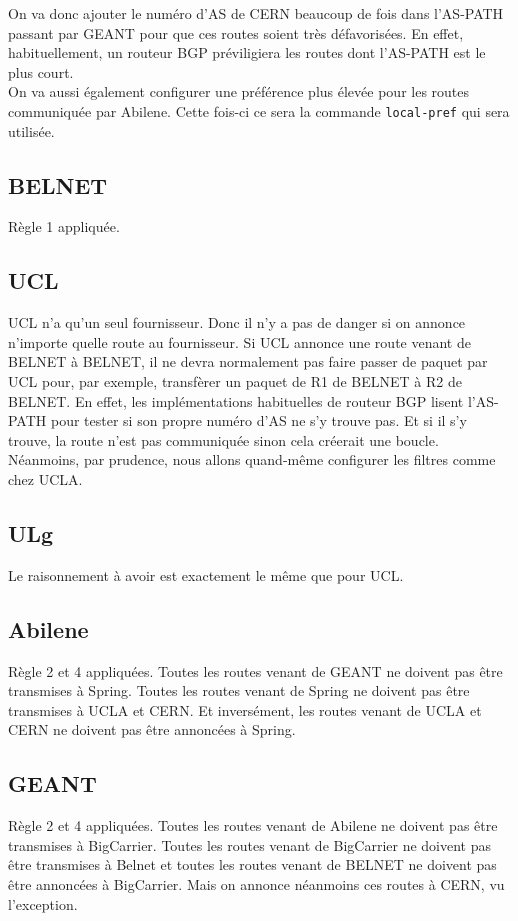 \documentclass[a4paper, 12pt]{article}
\begin{document}
On va donc ajouter le numéro d'AS de CERN beaucoup de fois dans l'AS-PATH passant par GEANT pour que ces routes soient très défavorisées.
En effet, habituellement, un routeur BGP préviligiera les routes dont l'AS-PATH est le plus court. 
\\

On va aussi également configurer une préférence plus élevée pour les routes communiquée par Abilene.
Cette fois-ci ce sera la commande \texttt{local-pref} qui sera utilisée.

\subsection{BELNET}
Règle 1 appliquée.

\subsection{UCL}
UCL n'a qu'un seul fournisseur. Donc il n'y a pas de danger si on annonce n'importe quelle route au fournisseur.
Si UCL annonce une route venant de BELNET à BELNET, il ne devra normalement pas faire passer de paquet par UCL pour, par exemple, transfèrer un paquet de R1 de BELNET à R2 de BELNET.
En effet, les implémentations habituelles de routeur BGP lisent l'AS-PATH pour tester si son propre numéro d'AS ne s'y trouve pas.
Et si il s'y trouve, la route n'est pas communiquée sinon cela créerait une boucle.
Néanmoins, par prudence, nous allons quand-même configurer les filtres comme chez UCLA.

\subsection{ULg}
Le raisonnement à avoir est exactement le même que pour UCL.

\subsection{Abilene}
Règle 2 et 4 appliquées. Toutes les routes venant de GEANT ne doivent pas être transmises à Spring.
Toutes les routes venant de Spring ne doivent pas être transmises à UCLA et CERN.
Et inversément, les routes venant de UCLA et CERN ne doivent pas être annoncées à Spring.

\subsection{GEANT}
Règle 2 et 4 appliquées. Toutes les routes venant de Abilene ne doivent pas être transmises à BigCarrier.
Toutes les routes venant de BigCarrier ne doivent pas être transmises à Belnet et toutes les routes venant de BELNET ne doivent pas être annoncées à BigCarrier.
Mais on annonce néanmoins ces routes à CERN, vu l'exception.
\end{document}
